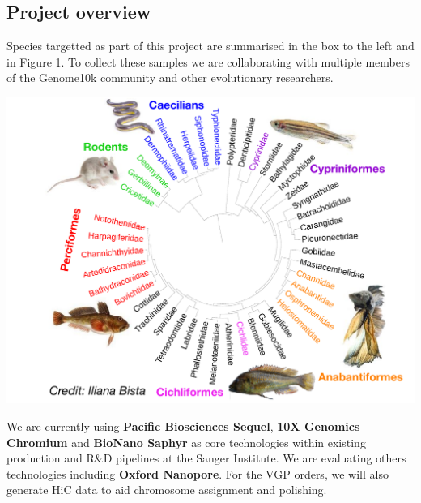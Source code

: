 \documentclass[a0,portrait]{a0poster}
\begin{document}
\begin{multicols}{3}
{\center\section*{Project overview}}

\noindent Species targetted as part of this project are summarised in the box to the left and in Figure 1. To collect these samples we are collaborating with multiple members of the Genome10k community and other evolutionary researchers.

\vspace{0.5cm}

\begin{center}
\captionsetup{type=figure}
\includegraphics[width=1.0\linewidth]{images/tree-with-images.pdf}
\end{center}

\vfill
\columnbreak

\noindent We are currently using \textbf{Pacific Biosciences Sequel}, \textbf{10X Genomics Chromium} and \textbf{BioNano Saphyr} as core technologies within existing production and R\&D pipelines at the Sanger Institute. We are evaluating others technologies including \textbf{Oxford Nanopore}. For the VGP orders, we will also generate HiC data to aid chromosome assignment and polishing.

\vspace{0.5cm}


\end{multicols}
\end{document}
